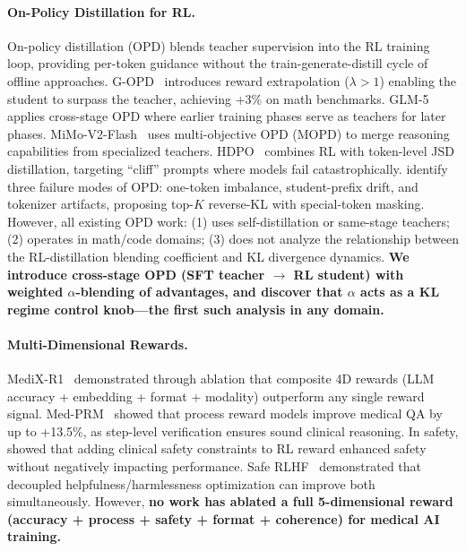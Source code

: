 \documentclass{article}
\begin{document}
\paragraph{On-Policy Distillation for RL.}
On-policy distillation (OPD) blends teacher supervision into the RL training loop, providing per-token guidance without the train-generate-distill cycle of offline approaches. G-OPD~\citep{gopd2026} introduces reward extrapolation ($\lambda > 1$) enabling the student to surpass the teacher, achieving +3\% on math benchmarks. GLM-5~\citep{glm5} applies cross-stage OPD where earlier training phases serve as teachers for later phases. MiMo-V2-Flash~\citep{mimo2026} uses multi-objective OPD (MOPD) to merge reasoning capabilities from specialized teachers. HDPO~\citep{hdpo2026} combines RL with token-level JSD distillation, targeting ``cliff'' prompts where models fail catastrophically. \citet{revisitopd2026} identify three failure modes of OPD: one-token imbalance, student-prefix drift, and tokenizer artifacts, proposing top-$K$ reverse-KL with special-token masking. However, all existing OPD work: (1) uses self-distillation or same-stage teachers; (2) operates in math/code domains; (3) does not analyze the relationship between the RL-distillation blending coefficient and KL divergence dynamics. \textbf{We introduce cross-stage OPD (SFT teacher $\to$ RL student) with weighted $\alpha$-blending of advantages, and discover that $\alpha$ acts as a KL regime control knob---the first such analysis in any domain.}

\paragraph{Multi-Dimensional Rewards.}
MediX-R1~\citep{medixr1} demonstrated through ablation that composite 4D rewards (LLM accuracy + embedding + format + modality) outperform any single reward signal. Med-PRM~\citep{zhang2025medprm} showed that process reward models improve medical QA by up to +13.5\%, as step-level verification ensures sound clinical reasoning. In safety, \citet{festor2022safety} showed that adding clinical safety constraints to RL reward enhanced safety without negatively impacting performance. Safe RLHF~\citep{dai2024saferlhf} demonstrated that decoupled helpfulness/harmlessness optimization can improve both simultaneously. However, \textbf{no work has ablated a full 5-dimensional reward (accuracy + process + safety + format + coherence) for medical AI training.}


\end{document}
